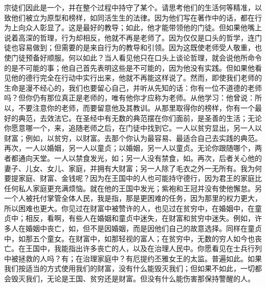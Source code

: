 宗徒们因此是一个，并在整个过程中持守了某个。请思考他们的生活何等精准，以致他们被立为原型和榜样，如同活生生的法律。因为他们写在著作中的话，都在行为上向众人彰显了。这是最好的教导；如此，他才能带领他的门徒。但如果他嘴上说着高深的哲理，行为却相反，他就不再是老师了。因为仅仅是口头的哲学，连门徒也容易做到；但需要的是来自行为的教导和引领。因为这既使老师受人敬重，也使门徒预备好顺服。何以如此？当人看见他只在口头上谈论哲理，就会说他所命令的是不可能的事；他自己首先表明这些是不可能的，因为他没有实践。但如果他看见他的德行完全在行动中实行出来，他就不再能这样说了。然而，即使我们老师的生命是漫不经心的，我们也要留心自己，并听从先知的话：你有一位不道德的老师吗？但你仍有那位真正是老师的，唯有他你才应称为老师。从他学习：他曾说：所以，不要注意你的老师，而要留意他及其教训。从那里取得你的榜样，你有一个最好的典范，去效法它。在圣经中有无数的典范摆在你们面前，是圣善的生活；无论你愿意哪一个，来，追随老师之后，在门徒中找到它。一人以贫穷显出，另一人以财富；例如，以贫穷，以财富。去那个你认为最容易、最适合自己去实践的典范。再次，一人以婚姻，另一人以童贞；以婚姻，另一人以童贞。无论你跟随哪个，两者都通向天堂。一人以禁食发光，如；另一人没有禁食，如。再次，后者关心他的妻子、儿女、女儿、家庭，并拥有大财富；另一人除了毛衣之外一无所有。我为何要提家庭、财富、金钱呢？因为在王国中的人也可能持守德行，因为君王的家庭比任何私人家庭更充满烦恼。就在他的王国中发光；紫袍和王冠并没有使他懈怠。另一个人被托付掌管全体人民，我是指，那是更困难的任务，因为那里的权力更大，所以困难也更大。你见过在财富中被赞许的人，也见过在贫穷中，在婚姻中，在童贞中；相反，看啊，有些人在婚姻和童贞中迷失，在财富和贫穷中迷失。例如，许多人在婚姻中丧亡，如，但不是因婚姻，而是因他们自己的故意选择。同样在童贞中，如那五个童女。在财富中，如那轻视的富人；在贫穷中，无数的穷人如今也丧亡。在王国中，我能指出许多丧亡的人，以及在治理人民中。你愿看见在士兵行列中被拯救的人吗？有；在治理家庭中？有厄提约丕雅女王的太监。普遍如此。如果我们按适当的方式使用我们的财富，没有什么能毁灭我们；但如果不如此，一切都会毁灭我们，无论是王国、贫穷还是财富。但没有什么能伤害那保持警醒的人。\par

